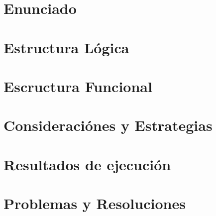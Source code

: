 \documentclass[12pt]{article}
\numberwithin{equation}{section}
\numberwithin{figure}{section}
\numberwithin{table}{section}
\begin{document}
%
%
\setcounter{page}{1}

%
%
\tableofcontents
\newpage

%
%
\section{Enunciado}
\pagebreak
\section{Estructura Lógica}
\pagebreak
\section{Escructura Funcional}
\pagebreak
\section{Consideraciónes y Estrategias}
\pagebreak
\section{Resultados de ejecución}
\pagebreak
\section{Problemas y Resoluciones}
\pagebreak
\end{document}

